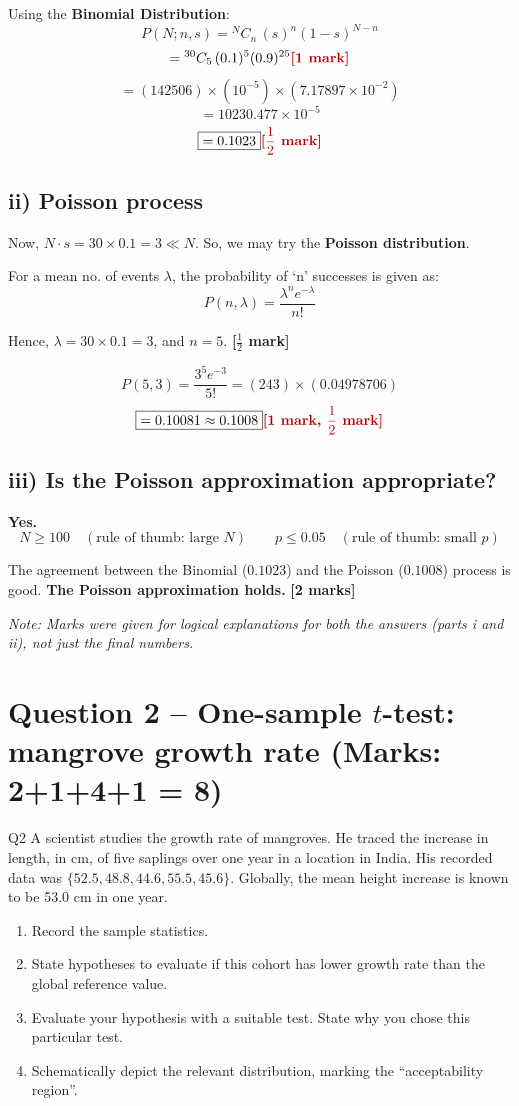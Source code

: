 \documentclass[11pt]{article}
\newcommand{\mk}[1]{\hfill\textcolor{markcolor}{\textbf{[#1]}}}
\begin{document}
Using the \textbf{Binomial Distribution}:
\[
P(N;n,s) = {}^{N}C_n\,(s)^n(1-s)^{N-n}
\]
\[
= {}^{30}C_5\,(0.1)^5(0.9)^{25} \mk{1 mark}
\]
\[
= (142506)\times(10^{-5})\times(7.17897\times10^{-2})
\]
\[
= 10230.477\times10^{-5}
\]
\[
\boxed{= 0.1023} \mk{$\frac{1}{2}$ mark}
\]

\subsection*{ii) Poisson process}
Now, $N\cdot s = 30\times0.1 = 3 \ll N$. So, we may try the \textbf{Poisson distribution}.

For a mean no. of events $\lambda$, the probability of `n' successes is given as:
\[
P(n,\lambda) = \frac{\lambda^n e^{-\lambda}}{n!}
\]

Hence, $\lambda = 30\times0.1 = 3$, and $n=5$. \mk{$\frac{1}{2}$ mark}

\[
P(5,3) = \frac{3^5 e^{-3}}{5!} = (243)\times(0.04978706)
\]
\[
\boxed{= 0.10081 \approx 0.1008} \mk{1 mark, $\frac{1}{2}$ mark}
\]

\subsection*{iii) Is the Poisson approximation appropriate?}
\textbf{Yes.}
\[
N \ge 100 \quad (\text{rule of thumb: large } N) \qquad p \le 0.05 \quad (\text{rule of thumb: small } p)
\]

The agreement between the Binomial ($0.1023$) and the Poisson ($0.1008$) process is good. \textbf{The Poisson approximation holds.} \mk{2 marks}

\textit{Note: Marks were given for logical explanations for both the answers (parts i and ii), not just the final numbers.}

\section{Question 2 -- One-sample $t$-test: mangrove growth rate (Marks: 2+1+4+1 = 8)}
\begin{question}{Q2}
A scientist studies the growth rate of mangroves. He traced the increase in length, in cm, of five saplings over one year in a location in India. His recorded data was $\{52.5, 48.8, 44.6, 55.5, 45.6\}$. Globally, the mean height increase is known to be 53.0 cm in one year.
\begin{enumerate}[label=\roman*)]
\item Record the sample statistics.
\item State hypotheses to evaluate if this cohort has lower growth rate than the global reference value.
\item Evaluate your hypothesis with a suitable test. State why you chose this particular test.
\item Schematically depict the relevant distribution, marking the ``acceptability region''.
\end{enumerate}
\end{question}
\end{document}
